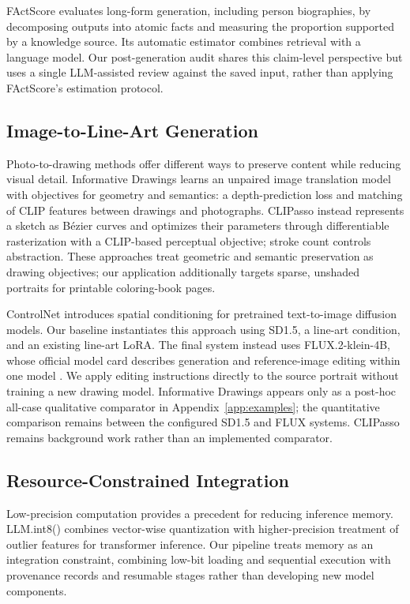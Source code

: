 \documentclass[11pt]{article}
\begin{document}
FActScore \citep{min-etal-2023-factscore} evaluates long-form generation, including person biographies, by decomposing outputs into atomic facts and measuring the proportion supported by a knowledge source. Its automatic estimator combines retrieval with a language model. Our post-generation audit shares this claim-level perspective but uses a single LLM-assisted review against the saved input, rather than applying FActScore's estimation protocol.

\subsection{Image-to-Line-Art Generation}

Photo-to-drawing methods offer different ways to preserve content while reducing visual detail. Informative Drawings \citep{chan-etal-2022-informative-drawings} learns an unpaired image translation model with objectives for geometry and semantics: a depth-prediction loss and matching of CLIP features between drawings and photographs. CLIPasso \citep{vinker-etal-2022-clipasso} instead represents a sketch as B\'{e}zier curves and optimizes their parameters through differentiable rasterization with a CLIP-based perceptual objective; stroke count controls abstraction. These approaches treat geometric and semantic preservation as drawing objectives; our application additionally targets sparse, unshaded portraits for printable coloring-book pages.

ControlNet \citep{zhang-etal-2023-controlnet} introduces spatial conditioning for pretrained text-to-image diffusion models. Our baseline instantiates this approach using SD1.5, a line-art condition, and an existing line-art LoRA. The final system instead uses FLUX.2-klein-4B, whose official model card describes generation and reference-image editing within one model \citep{flux2-klein-4b-model-card}. We apply editing instructions directly to the source portrait without training a new drawing model. Informative Drawings appears only as a post-hoc all-case qualitative comparator in Appendix~\ref{app:examples}; the quantitative comparison remains between the configured SD1.5 and FLUX systems. CLIPasso remains background work rather than an implemented comparator.

\subsection{Resource-Constrained Integration}

Low-precision computation provides a precedent for reducing inference memory. LLM.int8() \citep{dettmers-etal-2022-llmint8} combines vector-wise quantization with higher-precision treatment of outlier features for transformer inference. Our pipeline treats memory as an integration constraint, combining low-bit loading and sequential execution with provenance records and resumable stages rather than developing new model components.
\end{document}
